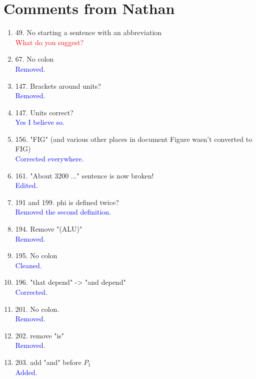 \documentclass[a4paper,11pt,twoside]{article}
\begin{document}
\section{Comments from Nathan}
\begin{enumerate}
   \item 49.   No starting a sentence with an abbreviation\\
      \textcolor{red}{What do you suggest?}
   \item 67.   No colon\\
      \textcolor{blue}{Removed.}
   \item 147.  Brackets around units?\\
      \textcolor{blue}{Removed. }
   \item 147.  Units correct?\\
      \textcolor{blue}{Yes I believe so. }
      
   \item 156.  "FIG" (and various other places in document Figure wasn't 
      converted to FIG)\\
      \textcolor{blue}{Corrected everywhere. }

   \item 161. "About 3200 ..." sentence is now broken!\\
      \textcolor{blue}{Edited. }

   \item 191 and 199.  phi is defined twice?\\
      \textcolor{blue}{Removed the second definition. }

   \item 194.  Remove "(ALU)"\\
      \textcolor{blue}{Removed. }

   \item 195.  No colon\\
      \textcolor{blue}{Cleaned. }

   \item 196.  "that depend" -> "and depend"\\
      \textcolor{blue}{Corrected. }

   \item 201.  No colon.\\
      \textcolor{blue}{Removed. }

   \item 202.  remove "is"\\
      \textcolor{blue}{Removed. }

   \item 203.  add "and" before $P_{1}$\\
      \textcolor{blue}{Added. }
      

\end{enumerate}
\end{document}

